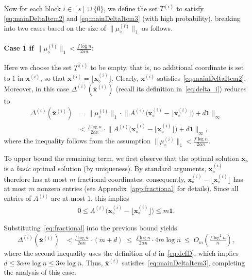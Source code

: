 \documentclass{article}
\newcommand{\xv}[0]{\mathbf{x}}
\newcommand{\ones}{{\bm{1}}}
\newcommand{\normm}[1]{\big\lVert#1\big\rVert}
\begin{document}
Now for each block $i \in [s] \cup \{0\}$, we define the set $T^{(i)}$ to satisfy \eqref{eq:mainDeltaItem2} and \eqref{eq:mainDeltaItem3} (with high probability), breaking into two cases based on the size of $\normm{\mu^{(i)}_{\diamond}}_1$ as follows. 


\paragraph{Case 1 if $\normm{\mu_{\diamond}^{(i)}}_1 < \frac{f \log n}{2\alpha n}$:} 
Here we choose the set $T^{(i)}$ to be empty, that is, no additional coordinate is
set to $1$ in $\bar{\xv}^{(i)}$, so that
$\bar{\xv}^{(i)} = \lfloor \xv^{(i)}_{\diamond} \rfloor$.
Clearly, $\bar{\xv}^{(i)}$ satisfies~\eqref{eq:mainDeltaItem2}.
Moreover, in this case $\Delta^{(i)}(\bar{\xv}^{(i)})$ (recall its definition
in~\eqref{eq:delta_i}) reduces to
%
\begin{align*}
\Delta^{(i)}(\bar{\xv}^{(i)})
&=
\big\|\mu^{(i)}_{\diamond}\big\|_1 \cdot
\big\| A^{(i)} \big(\xv^{(i)}_{\diamond}
- \lfloor \xv^{(i)}_{\diamond} \rfloor \big) + d \ones \big\|_{\infty} \\
&<
\frac{f \log n}{2\alpha n} \cdot
\big\| A^{(i)} \big(\xv^{(i)}_{\diamond}
- \lfloor \xv^{(i)}_{\diamond} \rfloor \big) + d \ones \big\|_{\infty},
\end{align*}
where the inequality follows from the assumption
$\|\mu^{(i)}_{\diamond}\|_1 < \frac{f \log n}{2\alpha n}$.

To upper bound the remaining term, we first observe that the optimal solution
$\xv_{\diamond}$ is a \emph{basic} optimal solution (by uniqueness).
By standard arguments, $\xv^{(i)}_{\diamond}$ therefore has at most $m$
fractional coordinates; consequently,
$\xv^{(i)}_{\diamond} - \lfloor \xv^{(i)}_{\diamond} \rfloor$
has at most $m$ nonzero entries (see Appendix~\ref{app:fractional} for details).
Since all entries of $A^{(i)}$ are at most $1$, this implies
%
\begin{align}
0 \le
A^{(i)} \big(\xv^{(i)}_{\diamond}
- \lfloor \xv^{(i)}_{\diamond} \rfloor \big)
\le m \ones.
\label{eq:fractional}
\end{align}

Substituting~\eqref{eq:fractional} into the previous bound yields
%
\begin{align*}
\Delta^{(i)}(\bar{\xv}^{(i)})
&<
\frac{f \log n}{2\alpha n} \cdot (m + d)
\;\le\;
\frac{f \log n}{2\alpha n} \cdot 4 m \log n
\;\le\;
O_m\!\left(\frac{f \log^2 n}{n}\right),
\end{align*}
where the second inequality uses the definition of $d$ in~\eqref{eq:defD},
which implies $d \le 3\alpha m \log n \le 3 m \log n$.
Thus, $\bar{\xv}^{(i)}$ satisfies~\eqref{eq:mainDeltaItem3}, completing the
analysis of this case.
\end{document}
